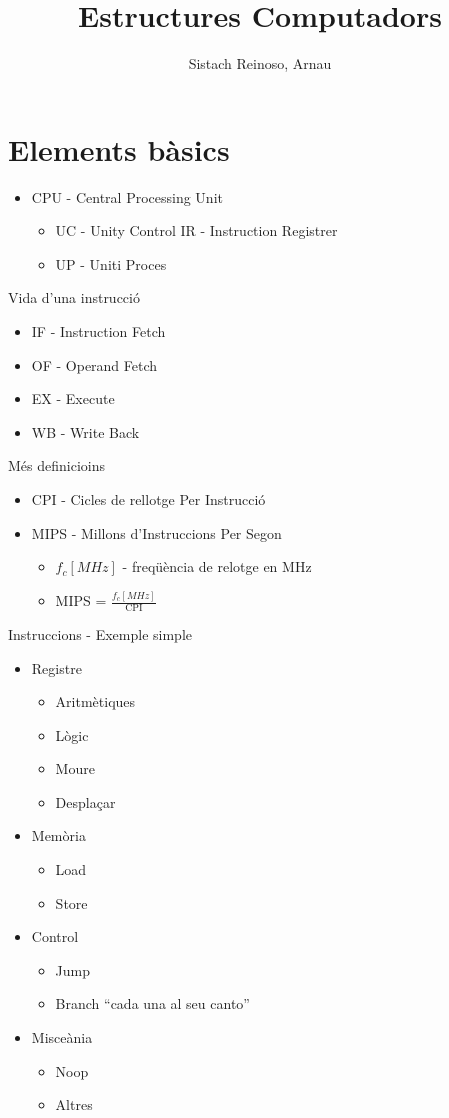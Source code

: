 \documentclass{article}
\title{Estructures Computadors}
\author{Sistach Reinoso, Arnau}
\begin{document}
\maketitle
\tableofcontents
\newpage
\section{Elements bàsics}
\begin{itemize}
\item CPU - Central Processing Unit
	\begin{itemize}
	\item UC - Unity Control
		\subitem IR - Instruction Registrer
	\item UP - Uniti Proces
	\end{itemize}
\end{itemize}
Vida d'una instrucció
\begin{itemize}
\item IF - Instruction Fetch
\item OF - Operand Fetch
\item EX - Execute
\item WB - Write Back
\end{itemize}
Més definicioins
\begin{itemize}
\item CPI - Cicles de rellotge Per Instrucció
\item MIPS - Millons d'Instruccions Per Segon
	\begin{itemize}
	\item $f_c[MHz]$ - freqüència de relotge en MHz
	\item MIPS = $\frac{f_c[MHz]}{\text{CPI}}$
	\end{itemize}
\end{itemize}
Instruccions - Exemple simple
\begin{itemize}
\item Registre
	\begin{itemize}
	\item Aritmètiques
	\item Lògic
	\item Moure
	\item Desplaçar
	\end{itemize}
\item Memòria
	\begin{itemize}
	\item Load
	\item Store
	\end{itemize}
\item Control
	\begin{itemize}
	\item Jump
	\item Branch ``cada una al seu canto''
	\end{itemize}
\item Misce\lgem ània
	\begin{itemize}
	\item Noop
	\item Altres
	\end{itemize}
\end{itemize}
\end{document}
